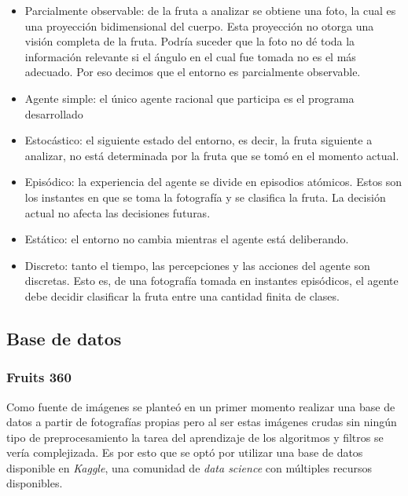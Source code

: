 \documentclass[10pt, a4paper]{article}
\begin{document}
\begin{itemize}
    \item Parcialmente observable: de la fruta a analizar se obtiene una foto, la cual es una proyección bidimensional del cuerpo. Esta proyección no otorga una visión completa de la fruta. Podría suceder que la foto no dé toda la información relevante si el ángulo en el cual fue tomada no es el más adecuado. Por eso decimos que el entorno es parcialmente observable.  
    
    \item Agente simple: el único agente racional que participa es el programa desarrollado
    
    \item Estocástico: el siguiente estado del entorno, es decir, la fruta siguiente a analizar, no está determinada por la fruta que se tomó en el momento actual. 
    
    \item Episódico: la experiencia del agente se divide en episodios atómicos. Estos son los instantes en que se toma la fotografía y se clasifica la fruta. La decisión actual no afecta las decisiones futuras.
    
    \item Estático: el entorno no cambia mientras el agente está deliberando.
    
    \item Discreto: tanto el tiempo, las percepciones y las acciones del agente son discretas. Esto es, de una fotografía tomada en instantes episódicos, el agente debe decidir clasificar la fruta entre una cantidad finita de clases.
\end{itemize}

\subsection{Base de datos}

\subsubsection{Fruits 360}

Como fuente de imágenes se planteó en un primer momento realizar una base de datos a partir de fotografías propias pero al ser estas imágenes crudas sin ningún tipo de preprocesamiento la tarea del aprendizaje de los algoritmos y filtros se vería complejizada. Es por esto que se optó por utilizar una base de datos disponible en \textit{Kaggle}, una comunidad de \textit{data science} con múltiples recursos disponibles. 
\end{document}
